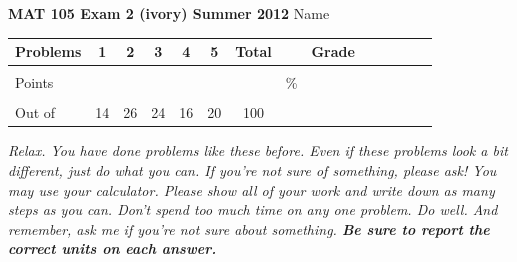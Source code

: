 \documentclass[12pt]{article}
\begin{document}
\textbf{MAT 105 Exam 2 (ivory) Summer 2012} \hspace{.4in} {\large Name} \hrulefill

\begin{center}

\begin{tabular}
{|l|c|c|c|c|c|c|c|c|c|c|c|c|c|} \hline

 Problems & \hspace{5 pt} 1 \hspace{5 pt}  & \hspace{5 pt} 2 \hspace{5 pt} & \hspace{5 pt} 3  \hspace{5 pt} & \hspace{5 pt} 4  \hspace{5 pt} & \hspace{5 pt}5 \hspace{5 pt} & \hspace{5 pt} Total  \hspace{5 pt} & &  \hspace{5 pt} Grade \hspace{5 pt}  \\ \hline
&&&&&&&&\\  
Points &&&&&&&    \hspace{.8in}\% &  \\ 
&&&&&&&& \\  \hline
Out of & 14 & 26 & 24  & 16 & 20 &100 & & \\ \hline

\end {tabular}

\end{center}

\vspace{.2in}

 \emph{Relax.  You have done problems like these before.  Even if these problems look a bit different, just do what you can.  If you're not sure of something, please ask! You may use your calculator.  Please show all of your work and write down as many steps as you can.  Don't spend too much time on any one problem.  Do well.  And remember, ask me if you're not sure about something.  \textbf{Be sure to report the correct units on each answer.}}

\hrulefill
\end{document}
